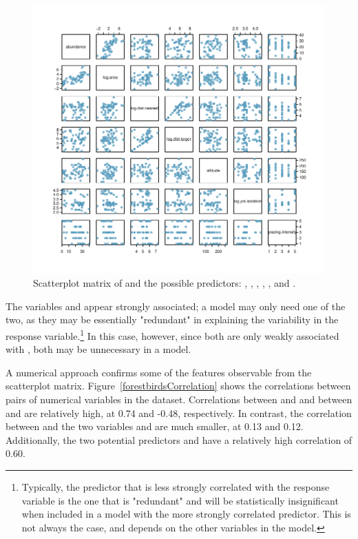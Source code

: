\begin{figure}[h]
 	\centering
 	\includegraphics[width=\textwidth]
{ch_multiple_linear_regression_oi_biostat/figures/forestbirdsScatterPlotMatrix/forestbirdsScatterPlotMatrix.pdf}
     \caption{Scatterplot matrix of  and the possible predictors:  , , , , , and .}
    	\label{forestbirdsScatterPlotMatrix}
\end{figure} 

\textD{\newpage}

The variables  and  appear strongly associated; a model may only need one of the two, as they may be essentially "redundant" in explaining the variability in the response variable.\footnote{Typically, the predictor that is less strongly correlated with the response variable is the one that is "redundant" and will be statistically insignificant when included in a model with the more strongly correlated predictor. This is not always the case, and depends on the other variables in the model.} In this case, however, since both are only weakly associated with , both may be unnecessary in a model.

    
A numerical approach confirms some of the features observable from the scatterplot matrix. Figure~\ref{forestbirdsCorrelation} shows the correlations between pairs of numerical variables in the dataset. Correlations between  and  and between  and  are relatively high, at 0.74 and -0.48, respectively. In contrast, the correlation between  and the two variables  and  are much smaller, at 0.13 and 0.12. Additionally, the two potential predictors  and  have a relatively high correlation of 0.60.

